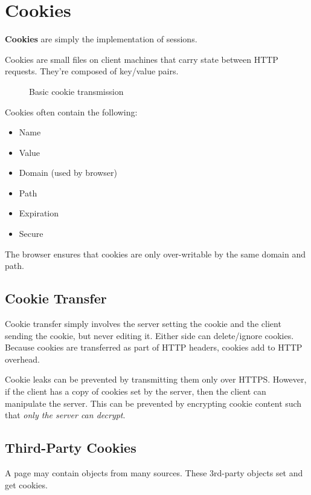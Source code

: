 \section{Cookies}
\textbf{Cookies} are simply the implementation of sessions.

\begin{definition}[Cookies]
	Cookies are small files on client machines that carry state between HTTP requests. They're composed of key/value pairs.
\end{definition}

\begin{figure}[H]
	\centering
	\caption{Basic cookie transmission}
	\label{fig:cookiesdiag}
\end{figure}

Cookies often contain the following:
\begin{itemize}
	\item Name
	\item Value
	\item Domain (used by browser)
	\item Path
	\item Expiration
	\item Secure
\end{itemize}

The browser ensures that cookies are only over-writable by the same domain and path.

\subsection{Cookie Transfer}
Cookie transfer simply involves the server setting the cookie and the client sending the cookie, but never editing it. Either side can delete/ignore cookies. Because cookies are transferred as part of HTTP headers, cookies add to HTTP overhead. \par

Cookie leaks can be prevented by transmitting them only over HTTPS. However, if the client has a copy of cookies set by the server, then the client can manipulate the server. This can be prevented by encrypting cookie content such that \emph{only the server can decrypt}. 

\subsection{Third-Party Cookies}
A page may contain objects from many sources. These 3rd-party objects set and get cookies.

